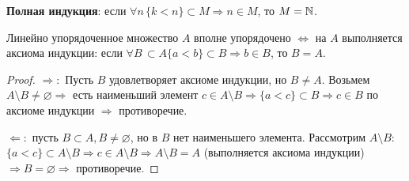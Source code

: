 \textbf{Полная индукция}: если $\forall n\, \{k < n\} \subset M \Rightarrow n \in M$, то $M=\mathbb{N}$.

\begin{claim}
	Линейно упорядоченное множество $A$ вполне упорядочено $\Leftrightarrow$ на $A$ выполняется аксиома индукции: если $\forall B\, \subset A \{a < b\} \subset B \Rightarrow b \in B$, то $B=A$.
\end{claim}
\begin{proof}
	$\Rightarrow:$ Пусть $B$ удовлетворяет аксиоме индукции, но $B \neq A$. Возьмем $A \setminus B \neq \varnothing \Rightarrow$ есть наименьший элемент $c \in A \setminus B \Rightarrow \{a < c\} \subset B \Rightarrow c \in B$ по аксиоме индукции $\Rightarrow$ противоречие.
	
	$\Leftarrow:$ пусть $B \subset A, B \neq \varnothing$, но в $B$ нет наименьшего элемента. Рассмотрим $A \setminus B$: $\{a < c\} \subset A \setminus B \Rightarrow c \in A \setminus B \Rightarrow A \setminus B = A$ (выполняется аксиома индукции) $\Rightarrow B=\varnothing \Rightarrow$ противоречие.
\end{proof}